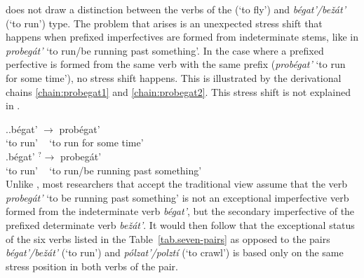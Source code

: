 \citet{Janda:10} does not draw a distinction between the verbs of the  (`to fly') and \textit{b\'{e}gat'\textsubscript{\INDET}/be\v{z}\'{a}t'\textsubscript{\DET}} (`to run') type. The problem that arises is an unexpected stress shift   that happens when prefixed imperfectives are formed from indeterminate stems, like in \textit{probeg\'{a}t'}\textsuperscript{\IPF} `to run/be running past  something'. In the case where a prefixed perfective is formed from the same verb with the same prefix (\textit{prob\'{e}g{a}t'}\textsuperscript{\PF} `to run for some time'), no stress shift   happens. This is illustrated by the derivational chains \ref{chain:probegat1} and \ref{chain:probegat2}. This stress shift   is not explained in \citet{Janda:10}.

\ex.\ag.\label{chain:probegat1}b\'{e}gat'\textsuperscript{\IPF} $\rightarrow$ prob\'{e}gat'\textsuperscript{\PF}\\
{`to run'} {~} {`to run for some time'}\\
\bg.\label{chain:probegat2}b\'{e}gat'\textsuperscript{\IPF} $^?\rightarrow$ probeg\'{a}t'\textsuperscript{\IPF}\\
{`to run'} {~} {`to run/be running past  something'}\\

Unlike \citet{Janda:10}, most researchers that accept the traditional view assume that the verb \textit{probeg\'{a}t'}\textsuperscript{\IPF} `to be running past  something' is not an exceptional imperfective verb  formed from the indeterminate verb   \textit{b\'{e}gat'}\textsuperscript{\IPF}, but the secondary imperfective  of the prefixed determinate verb  \textit{be\v{z}\'{a}t'}\textsuperscript{\IPF}. It would then follow that the exceptional status of the six verbs listed in the Table~\ref{tab.seven-pairs} as opposed to the pairs \textit{b\'{e}gat'/be\v{z}\'{a}t'} (`to run') and \textit{p\'{o}lzat'/polzt\'{i}} (`to crawl') is based only on the same stress position   in both verbs of the pair. 

